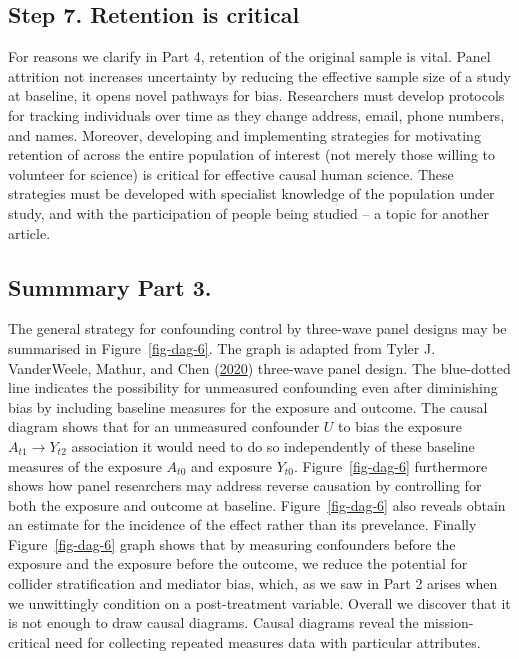 \documentclass[
  singlecolumn]{report}
\begin{document}
\hypertarget{step-7.-retention-is-critical}{%
\subsection{Step 7. Retention is
critical}\label{step-7.-retention-is-critical}}

For reasons we clarify in Part 4, retention of the original sample is
vital. Panel attrition not increases uncertainty by reducing the
effective sample size of a study at baseline, it opens novel pathways
for bias. Researchers must develop protocols for tracking individuals
over time as they change address, email, phone numbers, and names.
Moreover, developing and implementing strategies for motivating
retention of across the entire population of interest (not merely those
willing to volunteer for science) is critical for effective causal human
science. These strategies must be developed with specialist knowledge of
the population under study, and with the participation of people being
studied -- a topic for another article.

\hypertarget{summmary-part-3.}{%
\subsection{Summmary Part 3.}\label{summmary-part-3.}}

The general strategy for confounding control by three-wave panel designs
may be summarised in Figure~\ref{fig-dag-6}. The graph is adapted from
Tyler J. VanderWeele, Mathur, and Chen
(\protect\hyperlink{ref-vanderweele2020}{2020}) three-wave panel design.
The blue-dotted line indicates the possibility for unmeasured
confounding even after diminishing bias by including baseline measures
for the exposure and outcome. The causal diagram shows that for an
unmeasured confounder \(U\) to bias the exposure \(A_{t1}\to Y_{t2}\)
association it would need to do so independently of these baseline
measures of the exposure \(A_{t0}\) and exposure \(Y_{t0}\).
Figure~\ref{fig-dag-6} furthermore shows how panel researchers may
address reverse causation by controlling for both the exposure and
outcome at baseline. Figure~\ref{fig-dag-6} also reveals obtain an
estimate for the incidence of the effect rather than its prevelance.
Finally Figure~\ref{fig-dag-6} graph shows that by measuring confounders
before the exposure and the exposure before the outcome, we reduce the
potential for collider stratification and mediator bias, which, as we
saw in Part 2 arises when we unwittingly condition on a post-treatment
variable. Overall we discover that it is not enough to draw causal
diagrams. Causal diagrams reveal the mission-critical need for
collecting repeated measures data with particular attributes.
\end{document}
